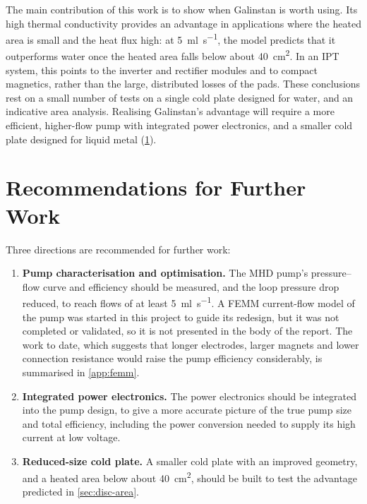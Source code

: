 The main contribution of this work is to show when Galinstan is worth using.
Its high thermal conductivity provides an advantage in applications where the
heated area is small and the heat flux high: at \SI{5}{\milli\litre\per\second},
the model predicts that it outperforms water once the heated area falls below
about \SI{40}{\centi\metre\squared}. In an IPT system, this points to the
inverter and rectifier modules and to compact magnetics, rather than
the large, distributed losses of the pads. These conclusions rest on a small
number of tests on a single cold plate designed for water, and an indicative area
analysis. Realising Galinstan's advantage will require a more
efficient, higher-flow pump with integrated power electronics, and a smaller cold
plate designed for liquid metal (\cref{sec:disc-further-work}).

\section{Recommendations for Further Work}
\label{sec:disc-further-work}

Three directions are recommended for further work:
\begin{enumerate}
  \item \textbf{Pump characterisation and optimisation.} The MHD pump's
    pressure--flow curve and efficiency should be measured, and the loop pressure
    drop reduced, to reach flows of at least \SI{5}{\milli\litre\per\second}. A
    FEMM current-flow model of the pump was started in this project to guide its
    redesign, but it was not completed or validated, so it is not presented in
    the body of the report. The work to date, which suggests that longer
    electrodes, larger magnets and lower connection resistance would raise the
    pump efficiency
    considerably, is summarised in \cref{app:femm}.
  \item \textbf{Integrated power electronics.} The power electronics should be
    integrated into the pump design, to give a more accurate picture of the true
    pump size and total efficiency, including the power conversion needed to
    supply its high current at low voltage.
  \item \textbf{Reduced-size cold plate.} A smaller cold plate with an improved
    geometry, and a heated area below about \SI{40}{\centi\metre\squared},
    should be built to test the advantage predicted in \cref{sec:disc-area}.
\end{enumerate}

